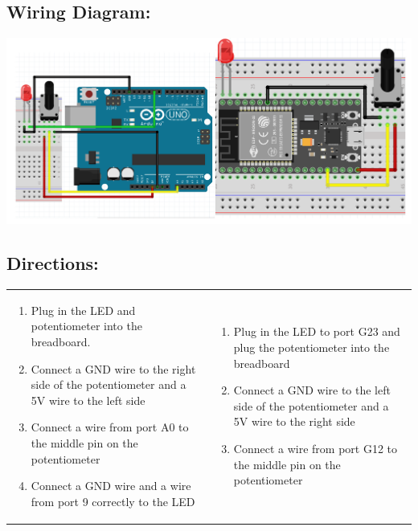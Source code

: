 \documentclass[a4paper,12pt]{report}
\newcommand{\diagramWidth}{150mm}
\begin{document}
    \subsection*{Wiring Diagram:}
    \includegraphics[width = \diagramWidth]{Assets/arduino_esp_pot.png}
    \newpage
    \subsection*{Directions:}
    \begin{center}
        \begin{tabularx}{\textwidth} { 
            | >{\raggedright\arraybackslash}X 
            | >{\raggedright\arraybackslash}X | }
            \hline
            \multicolumn{1}{|c|}{\textbf{Arduino}} & 
            \multicolumn{1}{|c|}{\textbf{ESP32}} \\
            \hline
            \begin{enumerate}
                \item Plug in the LED and potentiometer into the breadboard.
                \item Connect a GND wire to the right side of the potentiometer and a 5V wire to the left side
                \item Connect a wire from port A0 to the middle pin on the potentiometer
                \item Connect a GND wire and a wire from port 9 correctly to the LED
            \end{enumerate} &
            \begin{enumerate}
                \item Plug in the LED to port G23 and plug the potentiometer into the breadboard
                \item Connect a GND wire to the left side of the potentiometer and a 5V wire to the right side
                \item Connect a wire from port G12 to the middle pin on the potentiometer
            \end{enumerate} \\
            \hline
        \end{tabularx}
    \end{center}
\end{document}
